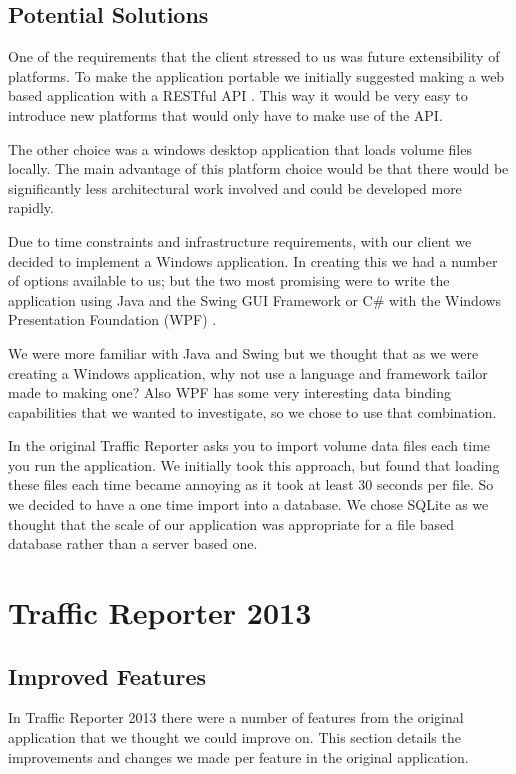 \documentclass{article}
\begin{document}
\subsection{Potential Solutions}
One of the requirements that the client stressed to us was
future extensibility of platforms. To make the application
portable we initially suggested making a web based
application with a RESTful API \cite{fielding2002principled}. This way it would be
very easy to introduce new platforms that would only have to
make use of the API.

The other choice was a windows desktop application that
loads volume files locally. The main advantage of this
platform choice would be that there would be significantly less
architectural work involved and could be developed more
rapidly.

Due to time constraints and infrastructure requirements, with our client we decided to implement a Windows application.
In creating this we had a number of options available to us; but the two most promising were to write the application using Java and the Swing GUI Framework \cite{swing} or C\# with the Windows Presentation Foundation (WPF) \cite{wpf}.

We were more familiar with Java and Swing but we thought that as we were creating a Windows application, why not use a language and framework tailor made to making one? Also WPF has some very interesting data binding capabilities that we wanted to investigate, so we chose to use that combination.

In the original Traffic Reporter asks you to import volume data files each time you run the application. We initially took this approach, but found that loading these files each time became annoying as it took at least 30 seconds per file. So we decided to have a one time import into a database. We chose SQLite \cite{sqlite} as we thought that the scale of our application was appropriate for a file based database rather than a server based one.

\section{Traffic Reporter 2013}
\subsection{Improved Features}
In Traffic Reporter 2013 there were a number of features from the original application that we thought we could improve on. This section details the improvements and changes we made per feature in the original application.
\end{document}
